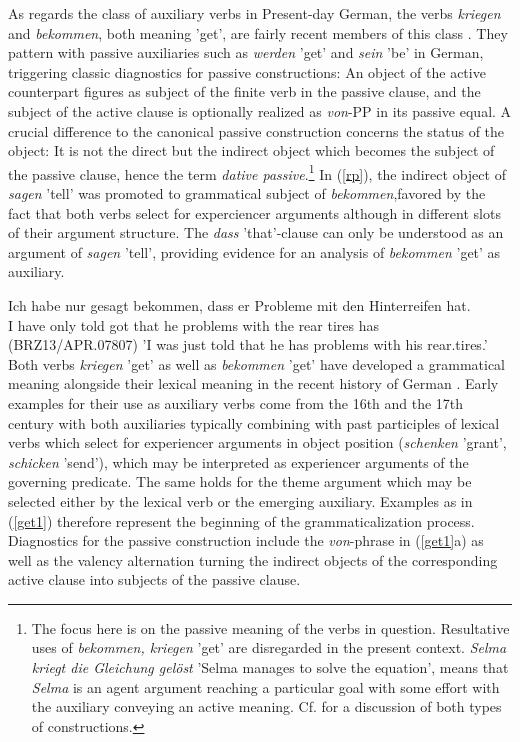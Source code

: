 \documentclass[output=paper]{langsci/langscibook}
\begin{document}
As regards the class of auxiliary verbs in Present-day German, the verbs \textit{kriegen} and \textit{bekommen}, both meaning 'get', are fairly recent members of this class \citep{reis1976}. They pattern with passive auxiliaries such as \textit{werden} 'get' and \textit{sein} 'be' in German, triggering classic diagnostics for passive constructions: An object of the  active counterpart figures as subject of the finite verb in the passive clause, and the subject of the active clause is optionally realized as \textit{von}-PP in its passive equal. A crucial difference to the canonical passive construction concerns the status of the object: It is not the direct but the indirect object which becomes the subject of the passive clause, hence the term \textit{dative passive}.\footnote{The focus here is on the passive meaning of the verbs in question. Resultative uses of \textit{bekommen, kriegen} 'get' are disregarded in the present context. \textit{Selma kriegt die Gleichung gelöst} 'Selma manages to solve the equation', means that \textit{Selma} is an agent argument reaching a particular goal with some effort with the auxiliary conveying an active meaning. Cf. \cite{reis1985a} for a discussion of both types of constructions.}  In (\ref{rp}), the indirect object of \textit{sagen} 'tell'  was promoted to grammatical subject of \textit{bekommen},favored by the fact that both verbs select for experciencer arguments although in different slots of their argument structure. The \textit{dass} 'that'-clause can only be understood as an argument of \textit{sagen} 'tell', providing evidence for an analysis of \textit{bekommen} 'get' as auxiliary.
  
\ea \label{rp} 
\gll  Ich habe nur gesagt bekommen, dass er Probleme mit den Hinterreifen hat.  \\  I have only told got that he problems with the {rear tires} has \\ \hfill  (BRZ13/APR.07807)
\glt 'I was just told that he has problems with his rear.tires.'
\z
Both verbs \textit{kriegen} 'get' as well as \textit{bekommen} 'get' have developed a grammatical meaning alongside their lexical meaning in the recent history of German \citep{glaser2005, lenz2012}. Early examples for their use as auxiliary verbs come from the 16th and the 17th century with both auxiliaries typically combining with past participles of lexical verbs which select for experiencer arguments in object position (\textit{schenken} 'grant', \textit{schicken} 'send'), which may be interpreted as experiencer arguments of the governing predicate. The same holds for the theme argument which may be selected either by the lexical verb or the emerging auxiliary. Examples as in (\ref{get1}) therefore represent the beginning of the grammaticalization process. Diagnostics for the passive construction include the \textit{von}-phrase in (\ref{get1}a) as well as the valency alternation turning the indirect objects of the corresponding active clause into subjects of the passive clause.
\end{document}
